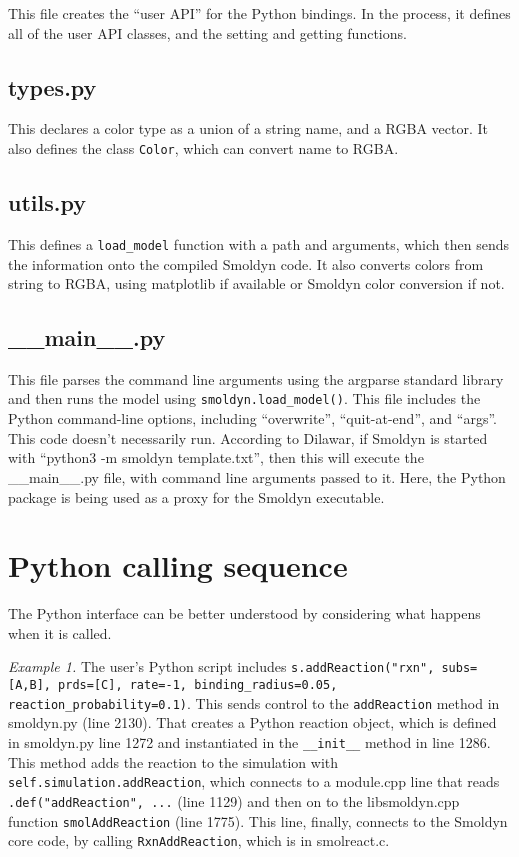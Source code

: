 \documentclass {scrbook}
\newcommand {\ttt} {\texttt}
\begin{document}
This file creates the ``user API'' for the Python bindings. In the process, it defines all of the user API classes, and the setting and getting functions.

\subsection*{types.py}

This declares a color type as a union of a string name, and a RGBA vector. It also defines the class \ttt{Color}, which can convert name to RGBA.

\subsection*{utils.py}

This defines a \ttt{load\_model} function with a path and arguments, which then sends the information onto the compiled Smoldyn code. It also converts colors from string to RGBA, using matplotlib if available or Smoldyn color conversion if not.

\subsection*{\_\_main\_\_.py}

This file parses the command line arguments using the argparse standard library and then runs the model using \ttt{smoldyn.load\_model()}. This file includes the Python command-line options, including ``overwrite'', ``quit-at-end'', and ``args''. This code doesn't necessarily run. According to Dilawar, if Smoldyn is started with ``python3 -m smoldyn template.txt'', then this will execute the \_\_main\_\_.py file, with command line arguments passed to it. Here, the Python package is being used as a proxy for the Smoldyn executable.


\section{Python calling sequence}

The Python interface can be better understood by considering what happens when it is called.

\textit{Example 1.} The user's Python script includes \ttt{s.addReaction("rxn", subs=[A,B], prds=[C], rate=-1, binding\_radius=0.05, reaction\_probability=0.1)}. This sends control to the \ttt{addReaction} method in smoldyn.py (line 2130). That creates a Python reaction object, which is defined in smoldyn.py line 1272 and instantiated in the \ttt{\_\_init\_\_} method in line 1286. This method adds the reaction to the simulation with \ttt{self.simulation.addReaction}, which connects to a module.cpp line that reads \ttt{.def("addReaction", ...} (line 1129) and then on to the libsmoldyn.cpp function \ttt{smolAddReaction} (line 1775). This line, finally, connects to the Smoldyn core code, by calling \ttt{RxnAddReaction}, which is in smolreact.c.
\end{document}
